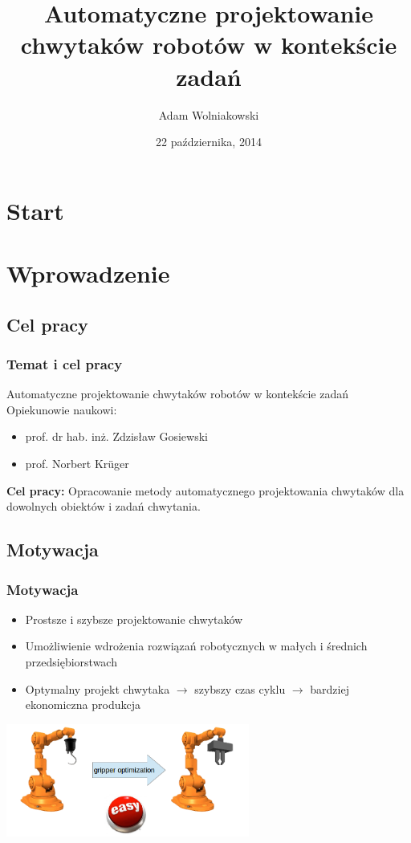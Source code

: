 \documentclass[12pt,a4paper,portrait]{beamer}
\author[AW]{Adam Wolniakowski}
\institute[WM PB]{Politechnika Białostocka}
\title[PhD]{Automatyczne projektowanie chwytaków robotów w kontekście zadań}
\date{22 października, 2014}
\begin{document}
\section{Start}
\begin{frame}
\titlepage
\end{frame}



\section{Wprowadzenie}
\subsection{Cel pracy}
\begin{frame}
\frametitle{Temat i cel pracy}
\begin{block}{Automatyczne projektowanie chwytaków robotów w kontekście zadań}
Opiekunowie naukowi:
\begin{itemize}
\item prof. dr hab. inż. Zdzisław Gosiewski
\item prof. Norbert Krüger
\end{itemize}
\end{block}


\textbf{Cel pracy:} Opracowanie metody automatycznego projektowania chwytaków dla dowolnych obiektów i zadań chwytania.
\end{frame}

\subsection{Motywacja}
\begin{frame}
\frametitle{Motywacja}
\begin{itemize}
\item Prostsze i szybsze projektowanie chwytaków
\item Umożliwienie wdrożenia rozwiązań robotycznych w małych i średnich przedsiębiorstwach
\item Optymalny projekt chwytaka $\rightarrow$ szybszy czas cyklu $\rightarrow$ bardziej ekonomiczna produkcja
\end{itemize}
\begin{center}
\includegraphics[width=0.6\textwidth]{images/motivation}
\end{center}
\end{frame}
\end{document}
